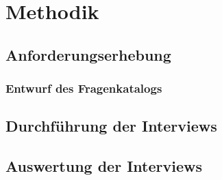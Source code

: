 \section{Methodik}\label{sec:methodik}
    \subsection{Anforderungserhebung}\label{subsec:anforderungserhebung}
        \subsubsection{Entwurf des Fragenkatalogs}\label{subsubsec:entwurf-fragenkatalog}
        \subsection{Durchführung der Interviews}\label{subsec:durchfuehrung-interviews}
    \subsection{Auswertung der Interviews}\label{subsec:auswertung-interviews}
